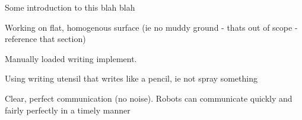 Some introduction to this blah blah
\begin{list}{A:~}{}
\item Working on flat, homogenous surface (ie no muddy ground - thats out of scope - reference that section)
\item Manually loaded writing implement. 
\item Using writing utensil that writes like a pencil, ie not spray something
\item Clear, perfect communication (no noise). Robots can communicate quickly and fairly perfectly in a timely manner
\end{list}


